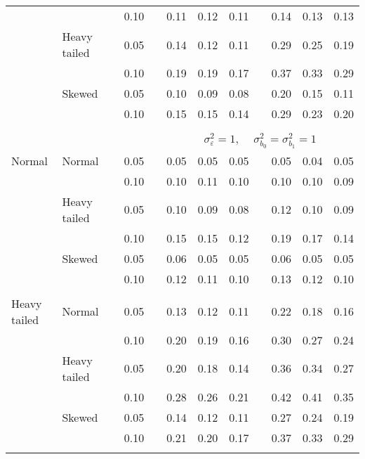 \begin{table}[ht]
\begin{scriptsize}
\begin{tabular}{ll p{.1cm} c p{.1cm} rrr p{.1cm} rrr}
             &              && 0.10 &&  0.11 & 0.12 & 0.11 && 0.14 & 0.13 & 0.13 \\ 
             & Heavy tailed && 0.05 &&  0.14 & 0.12 & 0.11 && 0.29 & 0.25 & 0.19 \\ 
             &              && 0.10 &&  0.19 & 0.19 & 0.17 && 0.37 & 0.33 & 0.29 \\ 
             & Skewed       && 0.05 &&  0.10 & 0.09 & 0.08 && 0.20 & 0.15 & 0.11 \\ 
             &              && 0.10 &&  0.15 & 0.15 & 0.14 && 0.29 & 0.23 & 0.20 \\ 

&&&&&&&&&&&\\
& && && \multicolumn{7}{c}{$\sigma_{\varepsilon}^2 = 1$, \ \ $\sigma_{b_0}^2 = \sigma_{b_1}^2 = 1$} \\ \cline{6-12}
\rowcolor{gray!20}Normal       & Normal       && 0.05 &&  0.05 & 0.05 & 0.05 && 0.05 & 0.04 & 0.05 \\ 
\rowcolor{gray!20}             &              && 0.10 &&  0.10 & 0.11 & 0.10 && 0.10 & 0.10 & 0.09 \\ 
\rowcolor{gray!20}             & Heavy tailed && 0.05 &&  0.10 & 0.09 & 0.08 && 0.12 & 0.10 & 0.09 \\ 
\rowcolor{gray!20}             &              && 0.10 &&  0.15 & 0.15 & 0.12 && 0.19 & 0.17 & 0.14 \\ 
\rowcolor{gray!20}             & Skewed       && 0.05 &&  0.06 & 0.05 & 0.05 && 0.06 & 0.05 & 0.05 \\ 
\rowcolor{gray!20}             &              && 0.10 &&  0.12 & 0.11 & 0.10 && 0.13 & 0.12 & 0.10 \\ 
             &&&&&&&&&&&\\
Heavy tailed & Normal       && 0.05 &&  0.13 & 0.12 & 0.11 && 0.22 & 0.18 & 0.16 \\ 
             &              && 0.10 &&  0.20 & 0.19 & 0.16 && 0.30 & 0.27 & 0.24 \\ 
             & Heavy tailed && 0.05 &&  0.20 & 0.18 & 0.14 && 0.36 & 0.34 & 0.27 \\ 
             &              && 0.10 &&  0.28 & 0.26 & 0.21 && 0.42 & 0.41 & 0.35 \\ 
             & Skewed       && 0.05 &&  0.14 & 0.12 & 0.11 && 0.27 & 0.24 & 0.19 \\ 
             &              && 0.10 &&  0.21 & 0.20 & 0.17 && 0.37 & 0.33 & 0.29 \\ 
             &&&&&&&&&&&\\

\end{tabular}
\end{scriptsize}
\end{table}
